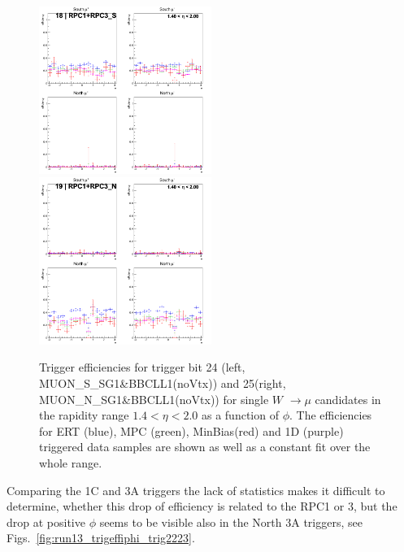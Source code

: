 \begin{figure}[ht]
  \centering
  \includegraphics[width=0.5\textwidth]{./figures/run13_trigeffiphi_eta1_trig18_lin.png}
  \includegraphics[width=0.5\textwidth]{./figures/run13_trigeffiphi_eta1_trig19_lin.png}
  \caption{
    Trigger efficiencies for trigger bit 24 (left, MUON\_S\_SG1\&BBCLL1(noVtx))
    and 25(right, MUON\_N\_SG1\&BBCLL1(noVtx)) for single $W$ $\rightarrow \mu$
    candidates in the rapidity range $ 1.4 < \eta < 2.0$ as a function of
    $\phi$. The efficiencies for ERT (blue), MPC (green), MinBias(red) and 1D
    (purple) triggered data samples are shown as well as a constant fit over the
    whole range.
  }
  \label{fig:run13_trigeffiphi_trig1819} 
\end{figure}

Comparing the 1C and 3A triggers the lack of statistics makes it difficult to
determine, whether this drop of efficiency is related to the RPC1 or 3, but the
drop at positive $\phi$ seems to be visible also in the North 3A triggers, see
Figs.~\ref{fig:run13_trigeffiphi_trig2223}.

